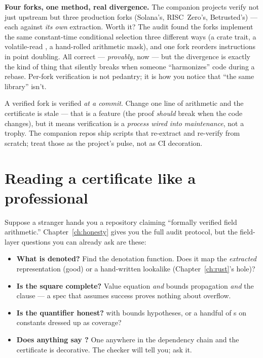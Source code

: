\textbf{Four forks, one method, real divergence.} The companion projects
verify not just upstream  but three production forks
(Solana's, RISC~Zero's, Betrusted's) --- each against \emph{its own}
extraction. Worth it? The audit found the forks implement the same
constant-time conditional selection three different ways (a 
crate trait, a volatile-read , a hand-rolled arithmetic
mask), and one fork reorders instructions in point doubling. All correct ---
\emph{provably}, now --- but the divergence is exactly the kind of thing
that silently breaks when someone ``harmonizes'' code during a rebase.
Per-fork verification is not pedantry; it is how you notice that ``the same
library'' isn't.

\begin{pitfall}
A verified fork is verified \emph{at a commit}. Change one line of
arithmetic and the certificate is stale --- that is a feature (the proof
\emph{should} break when the code changes), but it means verification is a
\emph{process wired into maintenance}, not a trophy. The companion repos
ship  scripts that re-extract and re-verify from scratch;
treat those as the project's pulse, not as CI decoration.
\end{pitfall}

\section{Reading a certificate like a professional}

Suppose a stranger hands you a repository claiming ``formally verified
field arithmetic.'' Chapter~\ref{ch:honesty} gives you the full audit
protocol, but the field-layer questions you can already ask are these:

\begin{itemize}[leftmargin=1.4em]
\item \textbf{What is denoted?} Find the denotation function. Does it map
  the \emph{extracted} representation (good) or a hand-written lookalike
  (Chapter~\ref{ch:rust}'s hole)?
\item \textbf{Is the square complete?} Value equation \emph{and} bounds
  propagation \emph{and} the  clause --- a spec that assumes
  success proves nothing about overflow.
\item \textbf{Is the quantifier honest?}  with bounds
  hypotheses, or a handful of s on constants dressed up as
  coverage?
\item \textbf{Does anything say ?} One  anywhere in
  the dependency chain and the certificate is decorative. The checker will
  tell you; ask it.
\end{itemize}

